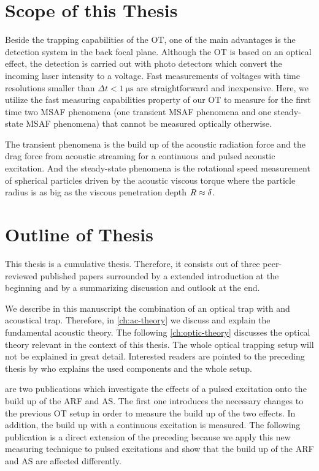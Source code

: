 \section{Scope of this Thesis}

Beside the trapping capabilities of the OT, one of the main advantages is the 
detection system in the back focal plane. Although the OT is based on an 
optical effect, the detection is carried out with photo detectors which convert 
the incoming laser intensity to a voltage. Fast measurements of voltages with 
time resolutions smaller than $\Delta t < \SI{1}{\us}$ are straightforward and 
inexpensive. Here, we utilize the fast measuring capabilities property of our 
OT to measure for the first time two MSAF phenomena (one transient MSAF 
phenomena and one steady-state MSAF phenomena) that cannot be measured 
optically otherwise.

The transient phenomena is the build up of the acoustic radiation force and the 
drag force from acoustic streaming for a continuous and pulsed acoustic 
excitation. And the steady-state phenomena is the rotational speed measurement 
of spherical particles driven by the acoustic viscous torque where the particle 
radius is as big as the viscous penetration depth $R\approx\delta$.

\section{Outline of Thesis\label{sec:I-outline}}

This thesis is a cumulative thesis. Therefore, it consists out of three 
peer-reviewed published papers surrounded by a extended introduction at the 
beginning and by a summarizing discussion and outlook at the end.

We describe in this manuscript the combination of an optical trap with and 
acoustical trap. Therefore, in \cref{ch:ac-theory} we discuss and explain the 
fundamental acoustic theory. The following \cref{ch:optic-theory} discusses the 
optical theory relevant in the context of this thesis. The whole optical 
trapping setup will not be explained in great detail. Interested readers are 
pointed to the preceding thesis by  who explains the used 
components and the whole setup.

 are two publications which investigate the 
effects of a pulsed excitation onto the build up of the ARF and AS. The first 
one introduces the necessary changes to the previous OT setup in order to 
measure the build up of the two effects. In addition, the build up with a 
continuous excitation is measured. The following publication is a direct 
extension of the preceding because we apply this new measuring technique to 
pulsed excitations and show that the build up of the ARF and AS are affected 
differently.

